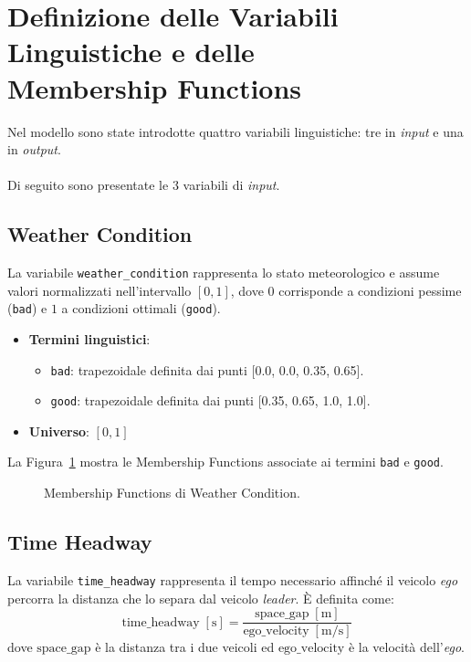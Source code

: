 \section{Definizione delle Variabili Linguistiche e delle \\ Membership Functions}

Nel modello sono state introdotte quattro variabili linguistiche: tre in \emph{input} e una in \emph{output}.
\\\\
Di seguito sono presentate le 3 variabili di \emph{input}.

\subsection{Weather Condition}
La variabile \texttt{weather\_condition} rappresenta lo stato meteorologico e assume valori normalizzati nell'intervallo \([0,1]\), 
dove \(0\) corrisponde a condizioni pessime (\texttt{bad}) e \(1\) a condizioni ottimali (\texttt{good}).  

\begin{itemize}
  \item \textbf{Termini linguistici}:
    \begin{itemize}
      \item \texttt{bad}: trapezoidale definita dai punti [0.0, 0.0, 0.35, 0.65].
      \item \texttt{good}: trapezoidale definita dai punti  [0.35, 0.65, 1.0, 1.0].
    \end{itemize}
  \item \textbf{Universo}: \([0,1]\)
\end{itemize}

\noindent La Figura~\ref{Fig:mf_weather_condition} mostra le Membership Functions associate ai termini \texttt{bad} e \texttt{good}.

\begin{figure}[H]
    \centering
    \caption{Membership Functions di Weather Condition.}
    \label{Fig:mf_weather_condition}
\end{figure}

\subsection{Time Headway}
La variabile \texttt{time\_headway} rappresenta il tempo necessario affinché il veicolo \emph{ego} 
percorra la distanza che lo separa dal veicolo \emph{leader}. È definita come:
\[
\text{time\_headway} \; [\mathrm{s}]
= \frac{\text{space\_gap}\;[\mathrm{m}]}{\text{ego\_velocity}\;[\mathrm{m}/\mathrm{s}]}
\]
dove \(\text{space\_gap}\) è la distanza tra i due veicoli ed \emph{\(\text{ego\_velocity}\)} è la velocità dell'\emph{ego}. 
